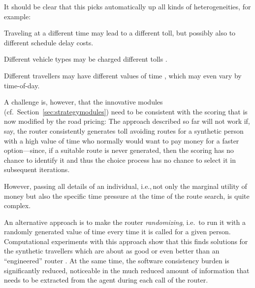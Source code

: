 It should be clear that this picks automatically up all kinds of heterogeneities, for example:
\begin{compactitem}

\item Traveling at a different time may lead to a different toll, but possibly also to different schedule delay costs. 

\item Different vehicle types may be charged different tolls \citep{KickhoeferNagel2012EmissionInternalization}.

\item Different travellers may have different values of time \citep{NagelKickhoeferJoubertHeterogeneousVoTs}, which may even vary by time-of-day.
  
\end{compactitem}

A challenge is, however, that the innovative modules (cf.~Section~\ref{sec:strategymodules}) need to be consistent with the scoring that is now modified by the road pricing: The approach described so far will not work if, say, the router consistently generates toll avoiding routes for a synthetic person with a high value of time who normally would want to pay money for a faster option---since, if a suitable route is never generated, then the scoring has no chance to identify it and thus the choice process has no chance to select it in subsequent iterations.

However, passing all details of an individual, i.e.,\,not only the marginal utility of money but also the specific time pressure at the time of the route search, is quite complex.

An alternative approach is to make the router \emph{randomizing}, i.e.\ to run it with a randomly generated value of time every time it is called for a given person.  Computational experiments with this approach show that this finds solutions for the synthetic travellers which are about as good or even better than an ``engineered'' router \citep{NagelKickhoeferJoubertHeterogeneousVoTs}.  At the same time, the software consistency burden is significantly reduced, noticeable in the much reduced amount of information that needs to be extracted from the agent during each call of the router.

